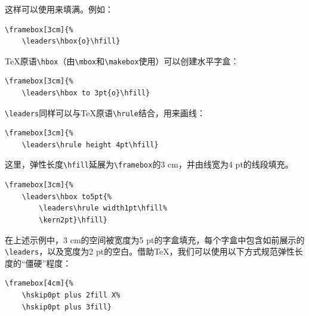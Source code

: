这样可以使用来填满。例如：

\begin{codelist}[10.13]{
}
\begin{verbatim}
\framebox[3cm]{%
    \leaders\hbox{o}\hfill}\end{verbatim}
\end{codelist}

\TeX 原语\verb|\hbox|（由\verb|\mbox|和\verb|\makebox|使用）可以创建水平字盒：

\begin{codelist}[10.14]{
}
\begin{verbatim}
\framebox[3cm]{%
    \leaders\hbox to 3pt{o}\hfill}\end{verbatim}
\end{codelist}

\verb|\leaders|同样可以与\TeX 原语\verb|\hrule|结合，用来画线：

\begin{codelist}[10.15]{
}
\begin{verbatim}
\framebox[3cm]{%
    \leaders\hrule height 4pt\hfill}\end{verbatim}
\end{codelist}

这里，弹性长度\verb|\hfill|延展为\verb|\framebox|的3 cm，并由线宽为4 pt的线段填充。

\begin{codelist}[10.16]{
}
\begin{verbatim}
\framebox[3cm]{%
    \leaders\hbox to5pt{%
        \leaders\hrule width1pt\hfill%
        \kern2pt}\hfill}\end{verbatim}
\end{codelist}

在上述示例中，3 cm的空间被宽度为5 pt的字盒填充，每个字盒中包含如前展示的\verb|\leaders|，以及宽度为2 pt的空白。借助\TeX ，我们可以使用以下方式规范弹性长度的``僵硬''程度：

\begin{codelist}[10.17]{
}
\begin{verbatim}
\framebox[4cm]{%
    \hskip0pt plus 2fill X%
    \hskip0pt plus 3fill}\end{verbatim}
\end{codelist}

